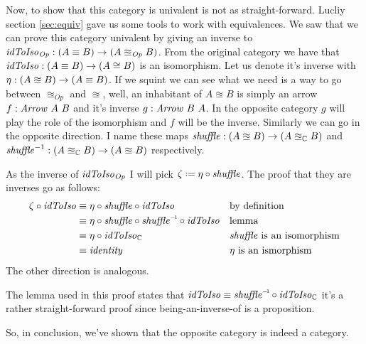 Now, to show that this category is univalent is not as straight-forward. Lucliy
section \ref{sec:equiv} gave us some tools to work with equivalences. We saw that we
can prove this category univalent by giving an inverse to
$\mathit{idToIso}_{\mathit{Op}} \;\mathord{:}\; (A \equiv B) \to (A \approxeq_{\mathit{Op}} B)$.
From the original category we have that $\mathit{idToIso} \;\mathord{:}\; (A \equiv B) \to (A \cong
B)$ is an isomorphism. Let us denote it's inverse with $\eta \;\mathord{:}\; (A \approxeq B)
\to (A \equiv B)$. If we squint we can see what we need is a way to go between
$\approxeq_{\mathit{Op}}$ and $\approxeq$, well, an inhabitant of $A \approxeq
B$ is simply an arrow $f \;\mathord{:}\; \mathit{Arrow}\ A\ B$ and it's inverse $g \;\mathord{:}\;
\mathit{Arrow}\ B\ A$. In the opposite category $g$ will play the role of the
isomorphism and $f$ will be the inverse. Similarly we can go in the opposite
direction. I name these maps $\mathit{shuffle} \;\mathord{:}\; (A \approxeq B) \to (A
\approxeq_{\mathbb{C}} B)$ and $\mathit{shuffle}^{-1} : (A \approxeq_{\mathbb{C}} B) \to (A
\approxeq B)$ respectively.

As the inverse of $\mathit{idToIso}_{\mathit{Op}}$ I will pick $\zeta \defeq \eta \comp
\mathit{shuffle}$. The proof that they are inverses go as follows:
%
\begin{align*}
\zeta \comp \idToIso & \equiv
\eta \comp \shuffle \comp \idToIso
&& \text{by definition} \\
%
& \equiv
\eta \comp \shuffle \comp \inv{\shuffle} \comp \idToIso
&& \text{lemma} \\
& \equiv
\eta \comp \idToIso_{\bC}
&& \text{$\shuffle$ is an isomorphism} \\
& \equiv
\identity
&& \text{$\eta$ is an ismorphism}
\end{align*}
%
The other direction is analogous.

The lemma used in this proof states that $\idToIso \equiv \inv{\shuffle} \comp
\idToIso_{\bC}$ it's a rather straight-forward proof since being-an-inverse-of
is a proposition.

So, in conclusion, we've shown that the opposite category is indeed a category.

